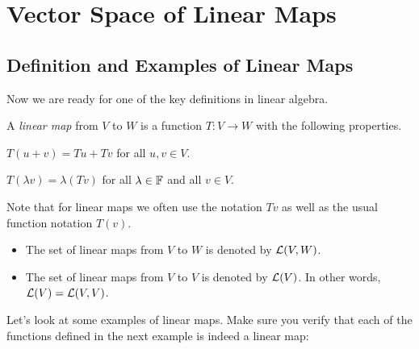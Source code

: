 \section{Vector Space of Linear Maps}

\subsection{Definition and Examples of Linear Maps}

Now we are ready for one of the key definitions in linear algebra.

\begin{definition}\label{ax:3.1}
A \emph{linear map} from $V$ to $W$ is a function $T\colon V\to W$ with the
following properties.
\begin{axprops}
\item[additivity] $T(u+v)=Tu+Tv$ for all $u,v\in V$.
\item[homogeneity] $T(\lambda v)=\lambda(Tv)$ for all $\lambda\in\mathbb{F}$ and all
  $v\in V$.
\end{axprops}
\end{definition}

%
Note that for linear maps we often use the notation $Tv$ as well as the usual
function notation $T(v)$.

\begin{notation}\label{ax:3.2}\leavevmode
\begin{itemize}
\item The set of linear maps from $V$ to $W$ is denoted by $\mathcal{L}(V,W)$.
\item The set of linear maps from $V$ to $V$ is denoted by $\mathcal{L}(V)$. In other
  words, $\mathcal{L}(V)=\mathcal{L}(V,V)$.
\end{itemize}
\end{notation}

Let's look at some examples of linear maps. Make sure you verify that each of
the functions defined in the next example is indeed a linear map:

